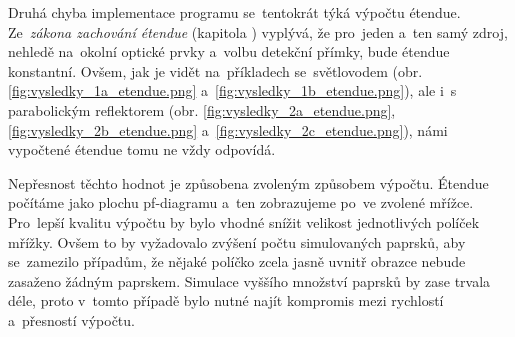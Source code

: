Druhá chyba implementace programu se~tentokrát týká výpočtu étendue. Ze~\emph{zákona zachování étendue} (kapitola ) vyplývá, že pro~jeden a~ten samý zdroj, nehledě na~okolní optické prvky a~volbu detekční přímky, bude étendue konstantní. Ovšem, jak je vidět na~příkladech se~světlovodem (obr. \ref{fig:vysledky_1a_etendue.png} a~\ref{fig:vysledky_1b_etendue.png}), ale i~s parabolickým reflektorem (obr. \ref{fig:vysledky_2a_etendue.png}, \ref{fig:vysledky_2b_etendue.png} a~\ref{fig:vysledky_2c_etendue.png}), námi vypočtené étendue tomu ne vždy odpovídá.

Nepřesnost těchto hodnot je způsobena zvoleným způsobem výpočtu. Étendue počítáme jako plochu pf-diagramu a~ten zobrazujeme po~ve zvolené mřížce. Pro~lepší kvalitu výpočtu by bylo vhodné snížit velikost jednotlivých políček mřížky. Ovšem to by vyžadovalo zvýšení počtu simulovaných paprsků, aby se~zamezilo případům, že nějaké políčko zcela jasně uvnitř obrazce nebude zasaženo žádným paprskem. Simulace vyššího množství paprsků by zase trvala déle, proto v~tomto případě bylo nutné najít kompromis mezi rychlostí a~přesností výpočtu.
